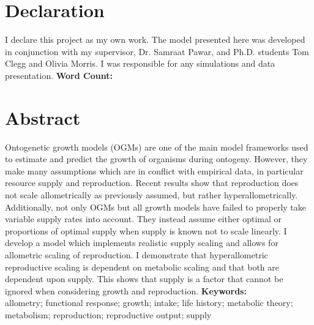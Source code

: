 \documentclass[a4paper, 11pt, hidelinks]{article} %
\newcommand\wordcount{} %
\begin{document}
	
	

	\section*{Declaration}
	I declare this project as my own work.  The model presented here was developed in conjunction with my supervisor, Dr. Samraat Pawar, and Ph.D. students Tom Clegg and Olivia Morris.  I was responsible for any simulations and data presentation.\newline
	\textbf{Word Count: \wordcount}

	\newpage
	
	\section*{Abstract}
	Ontogenetic growth models (OGMs) are one of the main model frameworks used to estimate and predict the growth of organisms during ontogeny.  However, they make many assumptions which are in conflict with empirical data, in particular resource supply and reproduction.  Recent results show that reproduction does not scale allometrically as previously assumed, but rather hyperallometrically.  Additionally, not only OGMs but all growth models have failed to properly take variable supply rates into account.  They instead assume either optimal or proportions of optimal supply when supply is known not to scale linearly.  
	I develop a model which implements realistic supply scaling and allows for allometric scaling of reproduction.  I demonstrate that hyperallometric reproductive scaling is dependent on metabolic scaling and that both are dependent upon supply.  This shows that supply is a factor that cannot be ignored when considering growth and reproduction.
%	
	\vspace*{0.5 cm}
	\newline
	\textbf{Keywords:}\\
	allometry; functional response; growth; intake; life history; metabolic theory; metabolism; reproduction; reproductive output; supply
	
\end{document}
